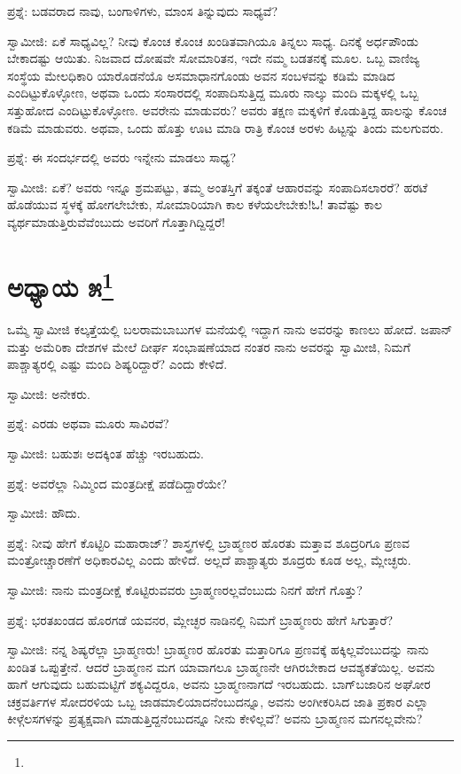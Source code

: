 ಪ್ರಶ್ನೆ: ಬಡವರಾದ ನಾವು, ಬಂಗಾಳಿಗಳು, ಮಾಂಸ ತಿನ್ನುವುದು ಸಾಧ್ಯವೆ?

ಸ್ವಾಮೀಜಿ: ಏಕೆ ಸಾಧ್ಯವಿಲ್ಲ? ನೀವು ಕೊಂಚ ಕೊಂಚ ಖಂಡಿತವಾಗಿಯೂ ತಿನ್ನಲು ಸಾಧ್ಯ. ದಿನಕ್ಕೆ ಅರ್ಧಪೌಂಡು ಬೇಕಾದಷ್ಟು ಆಯಿತು. ನಿಜವಾದ ದೋಷವೇ ಸೋಮಾರಿತನ, ಇದೇ ನಮ್ಮ ಬಡತನಕ್ಕೆ ಮೂಲ. ಒಬ್ಬ ವಾಣಿಜ್ಯ ಸಂಸ್ಥೆಯ ಮೇಲಧಿಕಾರಿ ಯಾರೊಡನೆಯೊ ಅಸಮಾಧಾನಗೊಂಡು ಅವನ ಸಂಬಳವನ್ನು ಕಡಿಮೆ ಮಾಡಿದ ಎಂದಿಟ್ಟುಕೊಳ್ಳೋಣ, ಅಥವಾ ಒಂದು ಸಂಸಾರದಲ್ಲಿ ಸಂಪಾದಿಸುತ್ತಿದ್ದ ಮೂರು ನಾಲ್ಕು ಮಂದಿ ಮಕ್ಕಳಲ್ಲಿ ಒಬ್ಬ ಸತ್ತುಹೋದ ಎಂದಿಟ್ಟುಕೊಳ್ಳೋಣ. ಅವರೇನು ಮಾಡುವರು? ಅವರು ತಕ್ಷಣ ಮಕ್ಕಳಿಗೆ ಕೊಡುತ್ತಿದ್ದ ಹಾಲನ್ನು ಕೊಂಚ ಕಡಿಮೆ ಮಾಡುವರು. ಅಥವಾ, ಒಂದು ಹೊತ್ತು ಊಟ ಮಾಡಿ ರಾತ್ರಿ ಕೊಂಚ ಅರಳು ಹಿಟ್ಟನ್ನು ತಿಂದು ಮಲಗುವರು.

ಪ್ರಶ್ನೆ: ಈ ಸಂದರ್ಭದಲ್ಲಿ ಅವರು ಇನ್ನೇನು ಮಾಡಲು ಸಾಧ್ಯ?

ಸ್ವಾಮೀಜಿ: ಏಕೆ? ಅವರು ಇನ್ನೂ ಶ್ರಮಪಟ್ಟು, ತಮ್ಮ ಅಂತಸ್ತಿಗೆ ತಕ್ಕಂತೆ ಆಹಾರವನ್ನು ಸಂಪಾದಿಸಲಾರರೆ? ಹರಟೆ ಹೊಡೆಯುವ ಸ್ಥಳಕ್ಕೆ ಹೋಗಲೇಬೇಕು, ಸೋಮಾರಿಯಾಗಿ ಕಾಲ ಕಳೆಯಲೇಬೇಕು!ಓ! ತಾವೆಷ್ಟು ಕಾಲ ವ್ಯರ್ಥಮಾಡುತ್ತಿರುವೆವೆಂಬುದು ಅವರಿಗೆ ಗೊತ್ತಾಗಿದ್ದಿದ್ದರೆ!

\newpage

\chapter[ಅಧ್ಯಾಯ ೫]{ಅಧ್ಯಾಯ ೫\protect\footnote{}}

ಒಮ್ಮೆ ಸ್ವಾಮೀಜಿ ಕಲ್ಕತ್ತೆಯಲ್ಲಿ ಬಲರಾಮಬಾಬುಗಳ ಮನೆಯಲ್ಲಿ ಇದ್ದಾಗ ನಾನು ಅವರನ್ನು ಕಾಣಲು ಹೋದೆ. ಜಪಾನ್ ಮತ್ತು ಅಮೆರಿಕಾ ದೇಶಗಳ ಮೇಲೆ ದೀರ್ಘ ಸಂಭಾಷಣೆಯಾದ ನಂತರ ನಾನು ಅವರನ್ನು ಸ್ವಾಮೀಜಿ, ನಿಮಗೆ ಪಾಶ್ಚಾತ್ಯರಲ್ಲಿ ಎಷ್ಟು ಮಂದಿ ಶಿಷ್ಯರಿದ್ದಾರೆ? ಎಂದು ಕೇಳಿದೆ.

ಸ್ವಾಮೀಜಿ: ಅನೇಕರು.

ಪ್ರಶ್ನೆ: ಎರಡು ಅಥವಾ ಮೂರು ಸಾವಿರವೆ?

ಸ್ವಾಮೀಜಿ: ಬಹುಶಃ ಅದಕ್ಕಿಂತ ಹೆಚ್ಚು ಇರಬಹುದು.

ಪ್ರಶ್ನೆ: ಅವರೆಲ್ಲಾ ನಿಮ್ಮಿಂದ ಮಂತ್ರದೀಕ್ಷೆ ಪಡೆದಿದ್ದಾರೆಯೇ?

ಸ್ವಾಮೀಜಿ: ಹೌದು.

ಪ್ರಶ್ನೆ: ನೀವು ಹೇಗೆ ಕೊಟ್ಟಿರಿ ಮಹಾರಾಜ್? ಶಾಸ್ತ್ರಗಳಲ್ಲಿ ಬ್ರಾಹ್ಮಣರ ಹೊರತು ಮತ್ತಾವ ಶೂದ್ರರಿಗೂ ಪ್ರಣವ ಮಂತ್ರೋಚ್ಚಾರಣೆಗೆ ಅಧಿಕಾರವಿಲ್ಲ ಎಂದು ಹೇಳಿದೆ. ಅಲ್ಲದೆ ಪಾಶ್ಚಾತ್ಯರು ಶೂದ್ರರು ಕೂಡ ಅಲ್ಲ, ಮ್ಲೇಚ್ಛರು.

ಸ್ವಾಮೀಜಿ: ನಾನು ಮಂತ್ರದೀಕ್ಷೆ ಕೊಟ್ಟಿರುವವರು ಬ್ರಾಹ್ಮಣರಲ್ಲವೆಂಬುದು ನಿನಗೆ ಹೇಗೆ ಗೊತ್ತು?

ಪ್ರಶ್ನೆ: ಭರತಖಂಡದ ಹೊರಗಡೆ ಯವನರ, ಮ್ಲೇಚ್ಛರ ನಾಡಿನಲ್ಲಿ ನಿಮಗೆ ಬ್ರಾಹ್ಮಣರು ಹೇಗೆ ಸಿಗುತ್ತಾರೆ?

ಸ್ವಾಮೀಜಿ: ನನ್ನ ಶಿಷ್ಯರೆಲ್ಲಾ ಬ್ರಾಹ್ಮಣರು! ಬ್ರಾಹ್ಮಣರ ಹೊರತು ಮತ್ತಾರಿಗೂ ಪ್ರಣವಕ್ಕೆ ಹಕ್ಕಿಲ್ಲವೆಂಬುದನ್ನು ನಾನು ಖಂಡಿತ ಒಪ್ಪುತ್ತೇನೆ. ಆದರೆ ಬ್ರಾಹ್ಮಣನ ಮಗ ಯಾವಾಗಲೂ ಬ್ರಾಹ್ಮಣನೇ ಆಗಿರಬೇಕಾದ ಆವಶ್ಯಕತೆಯಿಲ್ಲ. ಅವನು ಹಾಗೆ ಆಗುವುದು ಬಹುಮಟ್ಟಿಗೆ ಶಕ್ಯವಿದ್ದರೂ, ಅವನು ಬ್ರಾಹ್ಮಣನಾಗದೆ ಇರಬಹುದು. ಬಾಗ್‌ಬಜಾರಿನ ಅಘೋರ ಚಕ್ರವರ್ತಿಗಳ ಸೋದರಳಿಯ ಒಬ್ಬ ಜಾಡಮಾಲಿಯಾದನೆಂಬುದನ್ನೂ, ಅವನು ಅಂಗೀಕರಿಸಿದ ಜಾತಿ ಪ್ರಕಾರ ಎಲ್ಲಾ ಕೀಳ್ಗೆಲಸಗಳನ್ನು ಪ್ರತ್ಯಕ್ಷವಾಗಿ ಮಾಡುತ್ತಿದ್ದನೆಂಬುದನ್ನೂ ನೀನು ಕೇಳಿಲ್ಲವೆ? ಅವನು ಬ್ರಾಹ್ಮಣನ ಮಗನಲ್ಲವೇನು?

